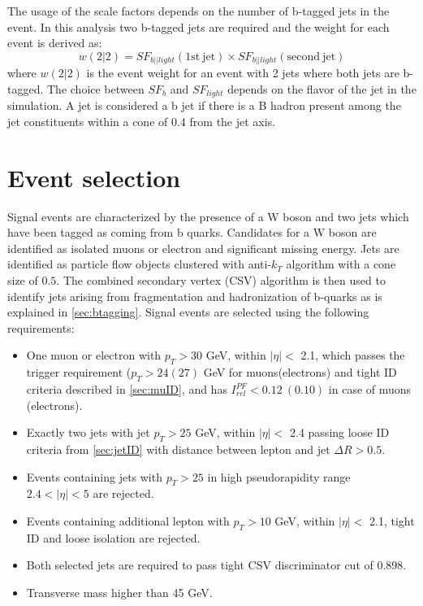 The usage of the scale factors depends on the number of b-tagged jets in the event. In this analysis two b-tagged jets are required and the weight for each event is derived as:
\begin{equation}
w(2|2)=SF_{b||light}(\mathrm{1st\ jet})\times SF_{b||light}(\mathrm{second\ jet})
\end{equation}
where $w(2|2)$ is the event weight for an event with 2 jets where both jets are b-tagged. The choice between $SF_{b}$ and $SF_{light}$ depends on the flavor of the jet in the simulation. A jet is considered a b jet if there is a B hadron present among the jet constituents within a cone of 0.4 from the jet axis.    




\section{Event selection}
\label{sec:selection}
Signal events are characterized by the presence of a W boson and two jets which have been tagged as coming from b quarks. 
Candidates for a W boson are identified as isolated muons or electron and significant missing energy. 
Jets are identified as particle flow objects clustered with anti-$k_T$ algorithm with a cone size of $0.5$.
The combined secondary vertex (CSV) algorithm is then used to identify jets arising from fragmentation and hadronization of b-quarks as is explained in \ref{sec:btagging}. Signal events are selected using the following requirements:
\begin{itemize}
\item One muon or electron with $p_T>30$ GeV, within $|\eta|<$ 2.1, which passes the trigger requirement ($p_T>24(27)$ GeV for muons(electrons) and tight ID criteria described in \ref{sec:muID}, and has $I_{rel}^{PF}<0.12\ (0.10)$ in case of muons (electrons).
\item Exactly two jets with jet $p_T>25$ GeV, within $|\eta|<$ 2.4 passing loose ID criteria from \ref{sec:jetID} with distance between lepton and jet $\Delta R>0.5$. 
\item Events containing jets with $p_T>25$ in high pseudorapidity range $2.4<|\eta|<5$ are rejected.
\item Events containing additional lepton with $p_T>10$ GeV, within $|\eta|<$ 2.1, tight ID and loose isolation are rejected.
\item Both selected jets are required to pass tight CSV discriminator cut of 0.898.
\item Transverse mass higher than 45 GeV.
\end{itemize} 

